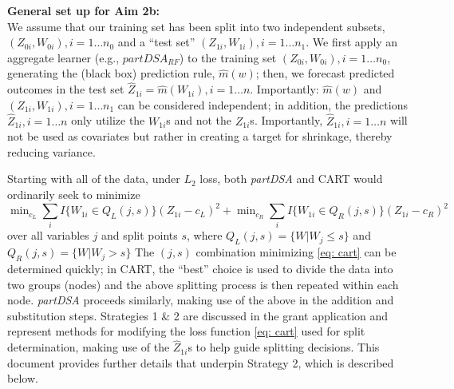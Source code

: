 \documentclass[12pt]{article}
\begin{document}
{\bf General set up for Aim 2b:}\\

We assume that our training set has been split into two independent subsets,
$(Z_{0i},W_{0i}), i = 1 \ldots n_0$ and a ``test set'' $(Z_{1i}, W_{1i}), i = 1
\ldots n_1$. We first apply an aggregate learner (e.g.,
$partDSA_{RF}$) to the training set $(Z_{0i}, W_{0i}), i = 1 \ldots
n_0$, generating the (black box) prediction rule, $\hat{m}(w)$; then,
we forecast predicted outcomes in the test set $\widehat{Z}_{1i} =
\hat{m}(W_{1i}), i = 1 \ldots n$.  Importantly: $\hat{m}(w)$ and
$(Z_{1i}, W_{1i}), i = 1 \ldots n_1$ can be considered independent; in
addition, the predictions $\widehat{Z}_{1i}, i = 1 \ldots n$ only
utilize the $W_{1i}$s and not the $Z_{1i}$s. Importantly,
 $\widehat{Z}_{1i}, i = 1 \ldots n$ will not be used
as covariates but rather in creating a target for shrinkage,
thereby reducing variance.

Starting with all of the data, under $L_2$ loss,
both \emph{partDSA} and CART would ordinarily seek to minimize
\begin{equation} \label{eq: cart}
\min\nolimits_{c_L} {\textstyle \sum\nolimits}_i I\{ W_{1i} \in Q_{L}(j,s) \} (Z_{1i}-c_L)^2
+ \min\nolimits_{c_R} {\textstyle \sum\nolimits}_i
I\{ W_{1i} \in Q_{R}(j,s) \}
(Z_{1i}-c_R)^2
\end{equation}
over all variables $j$ and split points $s$,
where
$Q_{L}(j,s) = \{W|W_{j} \leq s\}$ and $Q_{R}(j,s) = \{W|W_{j} >
s\}$ 
The $(j,s)$ combination minimizing \eqref{eq: cart} can be determined
quickly; in CART, the ``best'' choice is used to divide the
data into two groups (nodes) and the above splitting process is then
repeated within each node. \emph{partDSA} proceeds similarly,
making use of the above in
the addition and substitution steps.  Strategies 1 \& 2 are discussed
in the grant application and represent methods for modifying the
loss function \eqref{eq: cart} used for split determination, making use of the
$\widehat{Z}_{1i}$s to help guide splitting decisions. This document provides
further details that underpin Strategy 2, which is described below.\\
\end{document}
